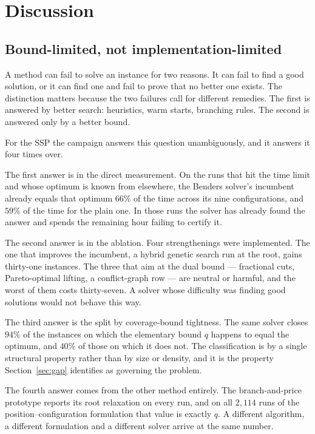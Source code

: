 \section{Discussion}\label{sec:disc}

\subsection{Bound-limited, not implementation-limited}\label{ssec:disc-bound}

A method can fail to solve an instance for two reasons. It can fail to find a good
solution, or it can find one and fail to prove that no better one exists. The
distinction matters because the two failures call for different remedies. The first
is answered by better search: heuristics, warm starts, branching rules. The second is
answered only by a better bound.

For the SSP the campaign answers this question unambiguously, and it answers it four
times over.

The first answer is in the direct measurement. On the runs that hit the time limit and
whose optimum is known from elsewhere, the Benders solver's incumbent already equals
that optimum $66\%$ of the time across its nine configurations, and $59\%$ of the time
for the plain one. In those runs the solver has already found the answer and spends the
remaining hour failing to certify it.

The second answer is in the ablation. Four strengthenings were implemented. The one
that improves the incumbent, a hybrid genetic search run at the root, gains thirty-one
instances. The three that aim at the dual bound --- fractional cuts, Pareto-optimal
lifting, a conflict-graph row --- are neutral or harmful, and the worst of them costs
thirty-seven. A solver whose difficulty was finding good solutions would not behave
this way.

The third answer is the split by coverage-bound tightness. The same solver closes
$94\%$ of the instances on which the elementary bound $q$ happens to equal the
optimum, and $40\%$ of those on which it does not. The classification is by a single structural property rather than by size or density,
and it is the property Section~\ref{sec:gap} identifies as governing the problem.

The fourth answer comes from the other method entirely. The branch-and-price prototype
reports its root relaxation on every run, and on all $2{,}114$ runs of the
position--configuration formulation that value is exactly $q$. A different algorithm,
a different formulation and a different solver arrive at the same number.

